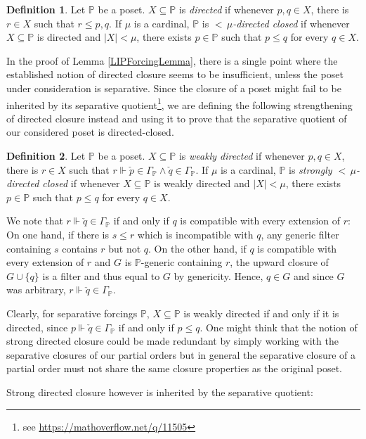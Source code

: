 \documentclass[a4paper]{amsart}
\theoremstyle{definition}
\newtheorem{mydef}{Definition}[section]
\theoremstyle{remark}
\theoremstyle{plain}
\numberwithin{mydef}{section}
\newcommand{\dP}{\mathbb{P}}
\begin{document}
	\begin{mydef}
		Let $\dP$ be a poset. $X\subseteq\dP$ is \emph{directed} if whenever $p,q\in X$, there is $r\in X$ such that $r\leq p,q$. If $\mu$ is a cardinal, $\dP$ is \emph{${<}\,\mu$-directed closed} if whenever $X\subseteq\dP$ is directed and $|X|<\mu$, there exists $p\in\dP$ such that $p\leq q$ for every $q\in X$.
	\end{mydef}
	
	In the proof of Lemma \ref{LIPForcingLemma}, there is a single point where the established notion of directed closure seems to be insufficient, unless the poset under consideration is separative. Since the closure of a poset might fail to be inherited by its separative quotient\footnote{see \url{https://mathoverflow.net/q/11505}}, we are defining the following strengthening of directed closure instead and using it to prove that the separative quotient of our considered poset is directed-closed.
	
	\begin{mydef}
		Let $\dP$ be a poset. $X\subseteq\dP$ is \emph{weakly directed} if whenever $p,q\in X$, there is $r\in X$ such that $r\Vdash\check{p}\in\Gamma_{\dP}\wedge\check{q}\in\Gamma_{\dP}$. If $\mu$ is a cardinal, $\dP$ is \emph{strongly ${<}\,\mu$-directed closed} if whenever $X\subseteq\dP$ is weakly directed and $|X|<\mu$, there exists $p\in\dP$ such that $p\leq q$ for every $q\in X$.
	\end{mydef}
	
	We note that $r\Vdash\check{q}\in\Gamma_{\dP}$ if and only if $q$ is compatible with every extension of $r$: On one hand, if there is $s\leq r$ which is incompatible with $q$, any generic filter containing $s$ contains $r$ but not $q$. On the other hand, if $q$ is compatible with every extension of $r$ and $G$ is $\dP$-generic containing $r$, the upward closure of $G\cup\{q\}$ is a filter and thus equal to $G$ by genericity. Hence, $q\in G$ and since $G$ was arbitrary, $r\Vdash\check{q}\in\Gamma_{\dP}$.
	
	Clearly, for separative forcings $\dP$, $X\subseteq\dP$ is weakly directed if and only if it is directed, since $p\Vdash\check{q}\in\Gamma_{\dP}$ if and only if $p\leq q$. One might think that the notion of strong directed closure could be made redundant by simply working with the separative closures of our partial orders but in general the separative closure of a partial order must not share the same closure properties as the original poset.
	
	Strong directed closure however is inherited by the separative quotient:
	
\end{document}
